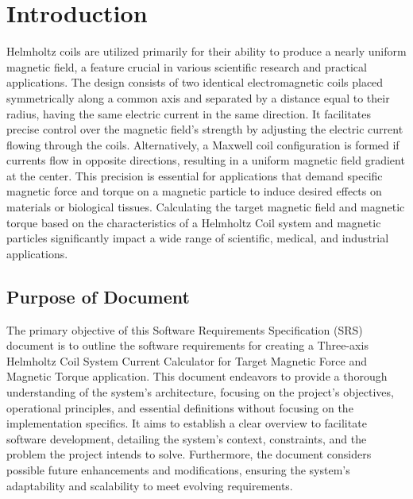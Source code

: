 \documentclass[12pt]{article}
\begin{document}
\newpage


\section{Introduction}
{
Helmholtz coils are utilized primarily for their ability to produce a nearly uniform magnetic field, a feature crucial in various scientific research and practical applications. The design consists of two identical electromagnetic coils placed symmetrically along a common axis and separated by a distance equal to their radius, having the same electric current in the same direction. It facilitates precise control over the magnetic field's strength by adjusting the electric current flowing through the coils. Alternatively, a Maxwell coil configuration is formed if currents flow in opposite directions, resulting in a uniform magnetic field gradient at the center. This precision is essential for applications that demand specific magnetic force and torque on a magnetic particle to induce desired effects on materials or biological tissues. Calculating the target magnetic field and magnetic torque based on the characteristics of a Helmholtz Coil system and magnetic particles significantly impact a wide range of scientific, medical, and industrial applications.
}

\subsection{Purpose of Document}
{
The primary objective of this Software Requirements Specification (SRS) document is to outline the software requirements for creating a Three-axis Helmholtz Coil System Current Calculator for Target Magnetic Force and Magnetic Torque application. This document endeavors to provide a thorough understanding of the system's architecture, focusing on the project's objectives, operational principles, and essential definitions without focusing on the implementation specifics. It aims to establish a clear overview to facilitate software development, detailing the system's context, constraints, and the problem the project intends to solve. Furthermore, the document considers possible future enhancements and modifications, ensuring the system's adaptability and scalability to meet evolving requirements.
}
\end{document}
